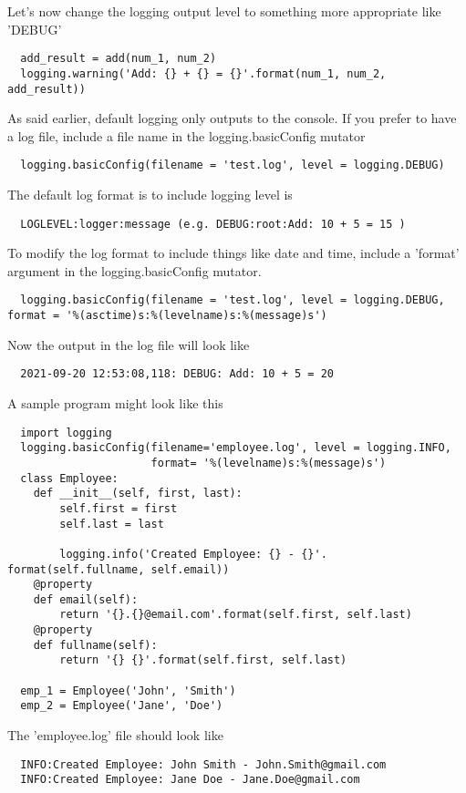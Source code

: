 \documentclass{article}%
\begin{document}
Let's now change the logging output level to something more appropriate like 'DEBUG'
\begin{lstlisting}
  add_result = add(num_1, num_2)
  logging.warning('Add: {} + {} = {}'.format(num_1, num_2, add_result))
\end{lstlisting}
As said earlier, default logging only outputs to the console. If you prefer to have a log file, include a file name in the logging.basicConfig mutator
\begin{lstlisting}
  logging.basicConfig(filename = 'test.log', level = logging.DEBUG)
\end{lstlisting}
The default log format is to include logging level is 
\begin{lstlisting}
  LOGLEVEL:logger:message (e.g. DEBUG:root:Add: 10 + 5 = 15 )
\end{lstlisting}
To modify the log format to include things like date and time, include a 'format' argument in the logging.basicConfig mutator. 
\begin{lstlisting}
  logging.basicConfig(filename = 'test.log', level = logging.DEBUG, format = '%(asctime)s:%(levelname)s:%(message)s')
\end{lstlisting}
Now the output in the log file will look like
\begin{lstlisting}
  2021-09-20 12:53:08,118: DEBUG: Add: 10 + 5 = 20
\end{lstlisting}
A sample program might look like this
\begin{lstlisting}
  import logging
  logging.basicConfig(filename='employee.log', level = logging.INFO,
                      format= '%(levelname)s:%(message)s')
  class Employee:
    def __init__(self, first, last):
        self.first = first
        self.last = last

        logging.info('Created Employee: {} - {}'. format(self.fullname, self.email))
    @property
    def email(self):
        return '{}.{}@email.com'.format(self.first, self.last)
    @property
    def fullname(self):
        return '{} {}'.format(self.first, self.last)
  
  emp_1 = Employee('John', 'Smith')
  emp_2 = Employee('Jane', 'Doe')
\end{lstlisting}
The 'employee.log' file should look like
\begin{lstlisting}
  INFO:Created Employee: John Smith - John.Smith@gmail.com
  INFO:Created Employee: Jane Doe - Jane.Doe@gmail.com
\end{lstlisting}
\end{document}
